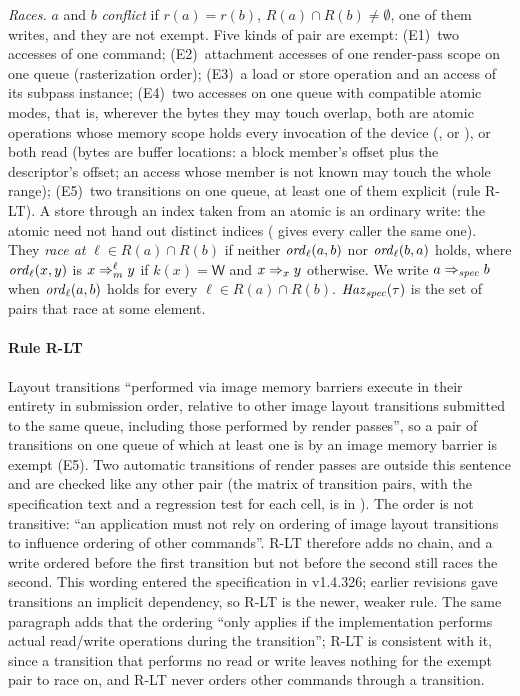 \begin{definition}
\emph{Races.} $a$ and $b$ \emph{conflict} if $r(a) = r(b)$, $R(a) \cap R(b) \ne \emptyset$, one of them writes, and
they are not exempt. Five kinds of pair are exempt: (E1)~two accesses of one command; (E2)~attachment accesses of one
render-pass scope on one queue (rasterization order); (E3)~a load or store operation and an access of its subpass
instance; (E4)~two accesses on one queue with compatible atomic modes, that is, wherever the bytes they may touch
overlap, both are atomic operations whose memory scope holds every invocation of the device (,
 or ), or both read (bytes are buffer locations: a block member's offset plus
the descriptor's offset; an access whose member is not known may touch the whole range); (E5)~two transitions on one queue, at least one of them explicit (rule R-LT).
A store through an index taken from an atomic is an ordinary write: the atomic need not hand out distinct indices
( gives every caller the same one).
They \emph{race at} $\ell \in R(a) \cap R(b)$ if neither $\mathit{ord}_{\ell}(a,b)$ nor $\mathit{ord}_{\ell}(b,a)$ holds, where
$\mathit{ord}_{\ell}(x,y)$ is $x \Rightarrow_{m}^{\ell} y$ if $k(x) = \mathsf{W}$ and $x \Rightarrow_{x} y$ otherwise. We write $a \Rightarrow_{\mathit{spec}} b$ when
$\mathit{ord}_{\ell}(a,b)$ holds for every $\ell \in R(a) \cap R(b)$. $\mathit{Haz}_{\mathit{spec}}(\tau)$ is the set of pairs that race at some
element.
\end{definition}

\paragraph{Rule R-LT}
Layout transitions ``performed via image memory barriers execute in their entirety in submission order, relative to
other image layout transitions submitted to the same queue, including those performed by render passes'', so a pair of
transitions on one queue of which at least one is by an image memory barrier is exempt (E5). Two automatic
transitions of render passes are outside this sentence and are checked like any other pair (the matrix of transition
pairs, with the specification text and a regression test for each cell, is in ). The order is not
transitive: ``an application must not rely on ordering of image layout transitions to influence ordering of other
commands''. R-LT therefore adds no chain, and a write ordered before the first transition but not before the second
still races the second. This wording entered the specification in v1.4.326; earlier revisions gave transitions an
implicit dependency, so R-LT is the newer, weaker rule. The same paragraph adds that the ordering ``only applies if the
implementation performs actual read/write operations during the transition''; R-LT is consistent with it, since a
transition that performs no read or write leaves nothing for the exempt pair to race on, and R-LT never orders other
commands through a transition.

